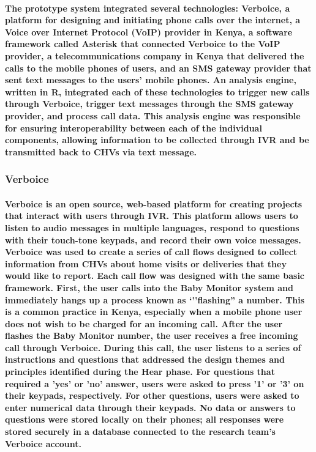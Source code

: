 \paragraph{The prototype system integrated several technologies: Verboice, a platform for designing and initiating phone calls over the internet, a Voice over Internet Protocol (VoIP) provider in Kenya, a software framework called Asterisk that connected Verboice to the VoIP provider, a telecommunications company in Kenya that delivered the calls to the mobile phones of users, and an SMS gateway provider that sent text messages to the users' mobile phones. An analysis engine, written in R, integrated each of these technologies to trigger new calls through Verboice, trigger text messages through the SMS gateway provider, and process call data. This analysis engine was responsible for ensuring interoperability between each of the individual components, allowing information to be collected through IVR and be transmitted back to CHVs via text message. }

\subsubsection{Verboice}

\paragraph{Verboice is an open source, web-based platform for creating projects that interact with users through IVR. This platform allows users to listen to audio messages in multiple languages, respond to questions with their touch-tone keypads, and record their own voice messages. Verboice was used to create a series of call flows designed to collect information from CHVs about home visits or deliveries that they would like to report. Each call flow was designed with the same basic framework. First, the user calls into the Baby Monitor system and immediately hangs up \textemdash   a process known as `''flashing'' a number. This is a common practice in Kenya, especially when a mobile phone user does not wish to be charged for an incoming call. After the user flashes the Baby Monitor number, the user receives a free incoming call through Verboice. During this call, the user listens to a series of instructions and questions that addressed the design themes and principles identified during the Hear phase. For questions that required a 'yes' or 'no' answer, users were asked to press '1' or '3' on their keypads, respectively. For other questions, users were asked to enter numerical data through their keypads. No data or answers to questions were stored locally on their phones; all responses were stored securely in a database connected to the research team's Verboice account. }

